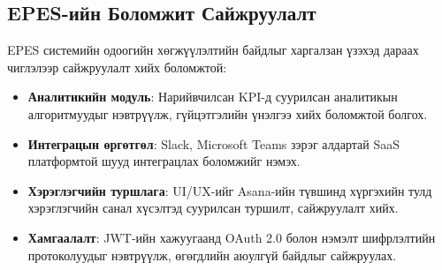 \subsection{EPES-ийн Боломжит Сайжруулалт}
EPES системийн одоогийн хөгжүүлэлтийн байдлыг харгалзан үзэхэд дараах чиглэлээр сайжруулалт хийх боломжтой:
\begin{itemize}
    \item \textbf{Аналитикийн модуль}: Нарийвчилсан KPI-д суурилсан аналитикын алгоритмуудыг нэвтрүүлж, гүйцэтгэлийн үнэлгээ хийх боломжтой болгох.
    \item \textbf{Интеграцын өргөтгөл}: Slack, Microsoft Teams зэрэг алдартай SaaS платформтой шууд интеграцлах боломжийг нэмэх.
    \item \textbf{Хэрэглэгчийн туршлага}: UI/UX-ийг Asana-ийн түвшинд хүргэхийн тулд хэрэглэгчийн санал хүсэлтэд суурилсан туршилт, сайжруулалт хийх.
    \item \textbf{Хамгаалалт}: JWT-ийн хажуугаанд OAuth 2.0 болон нэмэлт шифрлэлтийн протоколуудыг нэвтрүүлж, өгөгдлийн аюулгүй байдлыг сайжруулах.
\end{itemize}